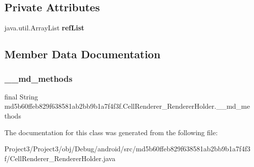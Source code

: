 \subsection*{Private Attributes}
\begin{DoxyCompactItemize}
\item 
\mbox{\label{classmd5b60ffeb829f638581ab2bb9b1a7f4f3f_1_1CellRenderer__RendererHolder_a5816b2be32fb4cd9e5417611fa927491}} 
java.\+util.\+Array\+List {\bfseries ref\+List}
\end{DoxyCompactItemize}


\subsection{Member Data Documentation}
\mbox{\label{classmd5b60ffeb829f638581ab2bb9b1a7f4f3f_1_1CellRenderer__RendererHolder_a4578cafbc2b812d71e4d477b6ee135b3}} 
\subsubsection{\texorpdfstring{\+\_\+\+\_\+md\+\_\+methods}{\_\_md\_methods}}
{\footnotesize\ttfamily final String md5b60ffeb829f638581ab2bb9b1a7f4f3f.\+Cell\+Renderer\+\_\+\+Renderer\+Holder.\+\_\+\+\_\+md\+\_\+methods\hspace{0.3cm}{\ttfamily [static]}}



The documentation for this class was generated from the following file\+:\begin{DoxyCompactItemize}
\item 
Project3/\+Project3/obj/\+Debug/android/src/md5b60ffeb829f638581ab2bb9b1a7f4f3f/Cell\+Renderer\+\_\+\+Renderer\+Holder.\+java\end{DoxyCompactItemize}
